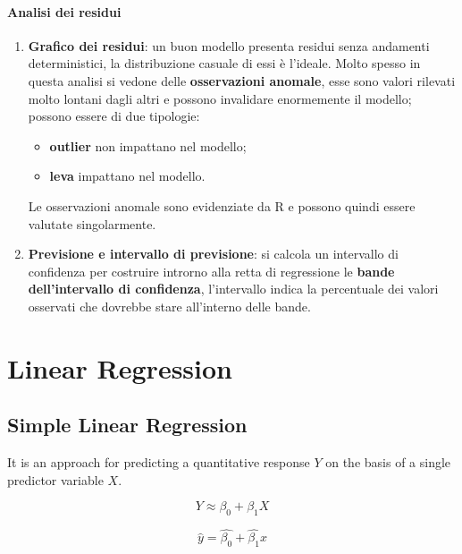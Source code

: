 \documentclass[a4paper]{article}
\begin{document}
				
				\paragraph{Analisi dei residui}
				
					\begin{enumerate}
						\item \textbf{Grafico dei residui}: un buon modello presenta residui senza andamenti deterministici, la distribuzione casuale di essi è l'ideale. Molto spesso in questa analisi si vedone delle \textbf{osservazioni anomale}, esse sono valori rilevati molto lontani dagli altri e possono invalidare enormemente il modello; possono essere di due tipologie:
						\begin{itemize}
							\item \textbf{outlier} non impattano nel modello;
							\item \textbf{leva} impattano nel modello.
						\end{itemize}
						Le osservazioni anomale sono evidenziate da R e possono quindi essere valutate singolarmente.
						
						\item \textbf{Previsione e intervallo di previsione}: si calcola un intervallo di confidenza per costruire introrno alla retta di regressione le \textbf{bande dell'intervallo di confidenza}, l'intervallo indica la percentuale dei valori osservati che dovrebbe stare all'interno delle bande.
					\end{enumerate}
					
					
	
	
	\section{Linear Regression}
		
		\subsection{Simple Linear Regression}
			It is an approach for predicting a quantitative response $Y$ on the basis of a single predictor variable $X$.
			
			\begin{equation}
				Y \approx \beta_0 + \beta_1 X
			\end{equation}
		
			\begin{equation}
				\hat{y} = \hat{\beta_0} + \hat{\beta_1}x				
			\end{equation}
			
\end{document}
